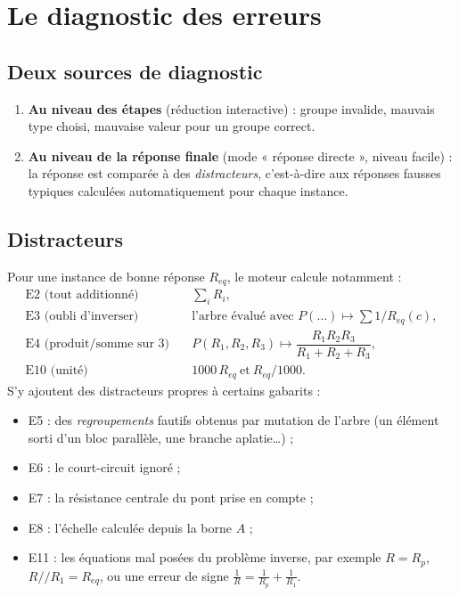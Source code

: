 \documentclass[11pt,a4paper]{report}
\newcommand{\req}{R_{eq}}
\newcommand{\para}{\mathbin{/\!/}}
\begin{document}
\chapter{Le diagnostic des erreurs}\label{ch:diag}

\section{Deux sources de diagnostic}
\begin{enumerate}
  \item \textbf{Au niveau des étapes} (réduction interactive) : groupe invalide, mauvais type choisi, mauvaise valeur pour un groupe correct.
  \item \textbf{Au niveau de la réponse finale} (mode « réponse directe », niveau facile) : la réponse est comparée à des \emph{distracteurs}, c'est-à-dire aux réponses fausses typiques calculées automatiquement pour chaque instance.
\end{enumerate}

\section{Distracteurs}
Pour une instance de bonne réponse $\req$, le moteur calcule notamment :
\begin{align}
  \text{E2 (tout additionné)} \quad & \textstyle\sum_i R_i, \\
  \text{E3 (oubli d'inverser)} \quad & \text{l'arbre évalué avec } P(\dots) \mapsto \textstyle\sum 1/\req(c), \\
  \text{E4 (produit/somme sur 3)} \quad & P(R_1,R_2,R_3) \mapsto \dfrac{R_1 R_2 R_3}{R_1 + R_2 + R_3}, \\
  \text{E10 (unité)} \quad & 1000\,\req \ \text{et}\ \req/1000.
\end{align}
S'y ajoutent des distracteurs propres à certains gabarits :
\begin{itemize}
  \item E5 : des \emph{regroupements} fautifs obtenus par mutation de l'arbre (un élément sorti d'un bloc parallèle, une branche aplatie…) ;
  \item E6 : le court-circuit ignoré ;
  \item E7 : la résistance centrale du pont prise en compte ;
  \item E8 : l'échelle calculée depuis la borne $A$ ;
  \item E11 : les équations mal posées du problème inverse, par exemple $R = R_p$, $R \para R_1 = \req$, ou une erreur de signe $\frac1R = \frac1{R_p} + \frac1{R_1}$.
\end{itemize}
\end{document}
